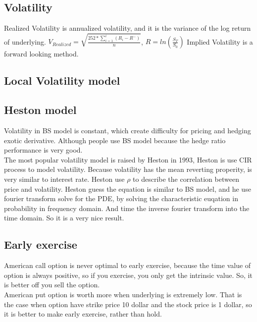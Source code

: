 \documentclass[a4paper,11pt]{article}
\begin{document}
\subsection{Volatility}
Realized Volatility is annualized volatility, and it is the variance of the log return of underlying. $V_{Realized}=\sqrt{\frac{252*\sum_{i=1}^{i} (R_i-R^-)}{n}}$, $R=ln(\frac{S_T}{S_0})$
Implied Volatility is a forward looking method.
\subsection{Local Volatility model}
\subsection{Heston model}
Volatility in BS model is constant, which create difficulty for pricing and hedging exotic derivative. Although people use BS model because the hedge ratio performance is very good.\\
The most popular volatility model is raised by Heston in 1993,  Heston is use CIR process to model volatility. Because volatility has the mean reverting properity, is very similar to interest rate. Heston use $\rho$ to describe the correlation between price and volatility. Heston guess the equation is similar to BS model, and he use fourier transform solve for the PDE, by solving the characteristic euqation in probability in frequency domain. And time the inverse fourier transform into the time domain. So it is a very nice result.\\
\subsection{Early exercise}
American call option is never optimal to early exercise, because the time value of option is always positive, so if you exercise, you only get the intrinsic value. So, it is better off you sell the option.\\
American put option is worth more when underlying is extremely low. That is the case when option have strike price 10 dollar and the stock price is 1 dollar, so it is better to make early exercise, rather than hold.
\end{document}
